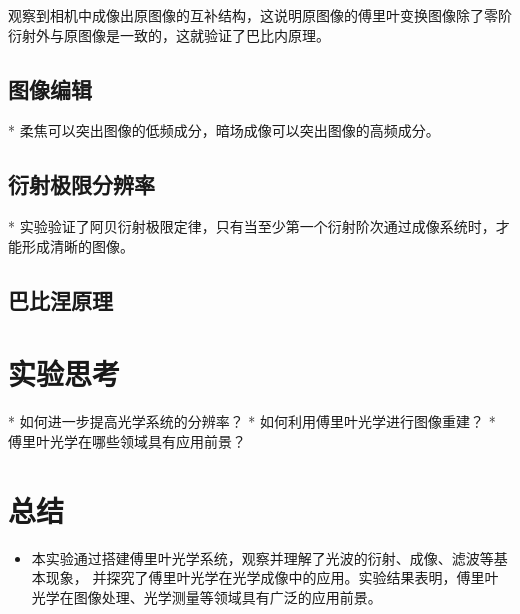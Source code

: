\documentclass{ctexart}
\begin{document}
观察到相机中成像出原图像的互补结构，这说明原图像的傅里叶变换图像除了零阶衍射外与原图像是一致的，这就验证了巴比内原理。
\subsection{图像编辑}
* 柔焦可以突出图像的低频成分，暗场成像可以突出图像的高频成分。
\subsection{衍射极限分辨率}
* 实验验证了阿贝衍射极限定律，只有当至少第一个衍射阶次通过成像系统时，才能形成清晰的图像。
\subsection{巴比涅原理}


\section{实验思考}
* 如何进一步提高光学系统的分辨率？
* 如何利用傅里叶光学进行图像重建？
* 傅里叶光学在哪些领域具有应用前景？

\section{总结}
\begin{itemize}
  \item 本实验通过搭建傅里叶光学系统，观察并理解了光波的衍射、成像、滤波等基本现象，
  并探究了傅里叶光学在光学成像中的应用。实验结果表明，傅里叶光学在图像处理、光学测量等领域具有广泛的应用前景。

\end{itemize}
\end{document}
